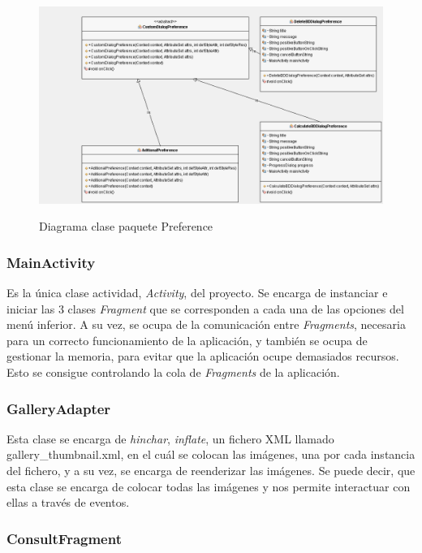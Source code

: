 \begin{figure}[H] %
\centering
\includegraphics[scale=0.4]{imagenes/diagrama6.png}  %
\label{diagrama6}
\caption{Diagrama clase paquete Preference}
\end{figure}


\subsubsection{MainActivity}

Es la única clase actividad, \textit{Activity}, del proyecto. Se encarga de instanciar e iniciar las 3 clases \textit{Fragment} que se corresponden a cada una de las opciones del menú inferior. A su vez, se ocupa de la comunicación entre \textit{Fragments}, necesaria para un correcto funcionamiento de la aplicación, y también se ocupa de gestionar la memoria, para evitar que la aplicación ocupe demasiados recursos. Esto se consigue controlando la cola de \textit{Fragments} de la aplicación.

\subsubsection{GalleryAdapter}

Esta clase se encarga de \textit{hinchar}, \textit{inflate}, un fichero XML llamado gallery\_thumbnail.xml, en el cuál se colocan las imágenes, una por cada instancia del fichero, y a su vez, se encarga de reenderizar las imágenes. Se puede decir, que esta clase se encarga de colocar todas las imágenes y nos permite interactuar con ellas a través de eventos.

\subsubsection{ConsultFragment}

